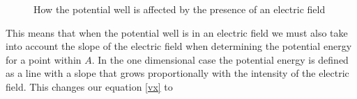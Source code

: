 \documentclass[authoryearcitations]{UoYCSproject}
\begin{document}
\begin{figure}[h]
  \centering
  \hspace{0.5 in}
    \caption{How the potential well is affected by the presence of an electric field}
  \label{fieldWell}
\end{figure}

This means that when the potential well is in an electric field we must also take into account the 
slope of the electric field when determining the potential energy for a point within $A$. In the one 
dimensional case the potential energy is defined as a line with a slope that grows proportionally 
with the intensity of the electric field. This changes our equation \ref{vx} to
\end{document}

